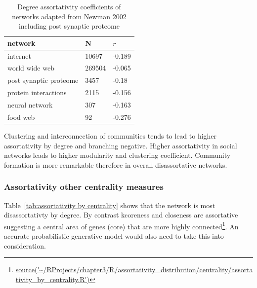 \begin{table}[]
    \centering
    \begin{tabular}{lll}
    \toprule
       network  &N& $r$  \\
       \midrule
       internet & 10697&-0.189\\
       world wide web &269504 & -0.065\\
       post synaptic proteome & 3457 & -0.18\\
       protein interactions & 2115 & -0.156\\
       neural network & 307 & -0.163\\
       food web & 92 & -0.276 \\
       \bottomrule
    \end{tabular}
    \caption{Degree assortativity coefficients of networks adapted from Newman 2002 \cite{newman2002assortative} including post synaptic proteome}
    \label{Table:DegreeAssortativityNewman}
\end{table}

 

Clustering and interconnection of communities tends to lead to higher assortativity by degree and branching negative\cite{estrada2011combinatorial}\cite{noldus2015assortativity}. Higher assortativity in social networks leads to higher modularity and clustering coefficient\cite{noldus2015assortativity}. Community formation is more remarkable therefore in overall disassortative networks. 

%
%
%
\subsubsection{Assortativity other centrality measures}


Table~\ref{tab:assortativity by centrality} shows that the network is most disassortativty by degree. By contrast kcoreness and closeness are assortative suggesting a central area of genes (core) that are more highly connected\footnote{\url{source('~/RProjects/chapter3/R/assortativity_distribution/centrality/assortativity_by_centrality.R')}}. An accurate probabilistic generative model would also need to take this into consideration.  

